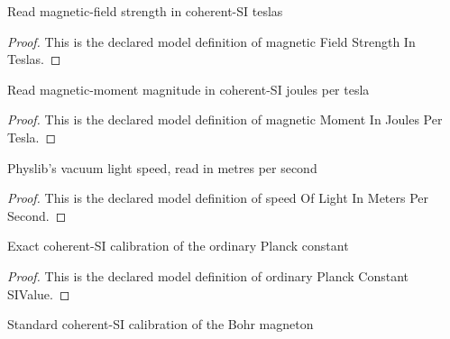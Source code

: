 \begin{definition}
  \label{def:physics:phyx-mini-0578:phyxminiproblems-problemphyxmini0578-magneticfieldstrengthinteslas}
  Read magnetic-field strength in coherent-SI teslas
\end{definition}
\begin{proof}
  This is the declared model definition of magnetic Field Strength In Teslas.
\end{proof}
\begin{definition}
  \label{def:physics:phyx-mini-0578:phyxminiproblems-problemphyxmini0578-magneticmomentinjoulespertesla}
  Read magnetic-moment magnitude in coherent-SI joules per tesla
\end{definition}
\begin{proof}
  This is the declared model definition of magnetic Moment In Joules Per Tesla.
\end{proof}
\begin{definition}
  \label{def:physics:phyx-mini-0578:phyxminiproblems-problemphyxmini0578-speedoflightinmeterspersecond}
  Physlib's vacuum light speed, read in metres per second
\end{definition}
\begin{proof}
  This is the declared model definition of speed Of Light In Meters Per Second.
\end{proof}
\begin{definition}
  \label{def:physics:phyx-mini-0578:phyxminiproblems-problemphyxmini0578-ordinaryplanckconstantsivalue}
  Exact coherent-SI calibration of the ordinary Planck constant
\end{definition}
\begin{proof}
  This is the declared model definition of ordinary Planck Constant SIValue.
\end{proof}
\begin{definition}
  \label{def:physics:phyx-mini-0578:phyxminiproblems-problemphyxmini0578-bohrmagnetonsivalue}
  Standard coherent-SI calibration of the Bohr magneton
\end{definition}
